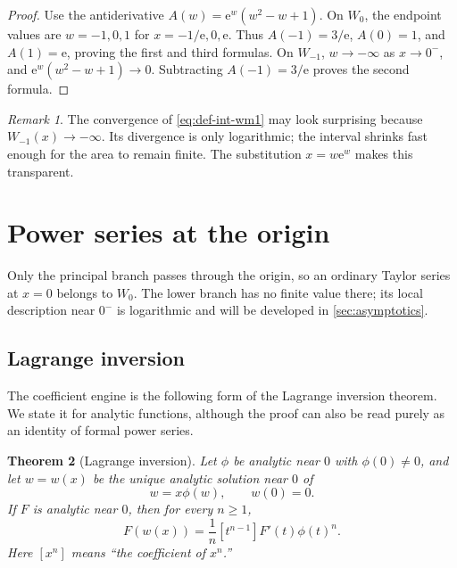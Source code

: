 \documentclass[11pt]{article}
\numberwithin{equation}{section}
\newtheorem{theorem}{Theorem}[section]
\theoremstyle{definition}
\theoremstyle{remark}
\newtheorem{remark}[theorem]{Remark}
\newcommand{\e}{\mathrm e}
\begin{document}
\begin{proof}
Use the antiderivative $A(w)=\e^w(w^2-w+1)$.  On $W_0$, the endpoint values
are $w=-1,0,1$ for $x=-1/\e,0,\e$.  Thus
$A(-1)=3/\e$, $A(0)=1$, and $A(1)=\e$, proving the first and third formulas.
On $W_{-1}$, $w\to-\infty$ as $x\to0^-$, and
$\e^w(w^2-w+1)\to0$.  Subtracting $A(-1)=3/\e$ proves the second formula.
\end{proof}

\begin{remark}
The convergence of \eqref{eq:def-int-wm1} may look surprising because
$W_{-1}(x)\to-\infty$.  Its divergence is only logarithmic; the interval
shrinks fast enough for the area to remain finite.  The substitution
$x=w\e^w$ makes this transparent.
\end{remark}

\section{Power series at the origin}
\label{sec:taylor}

Only the principal branch passes through the origin, so an ordinary Taylor
series at $x=0$ belongs to $W_0$.  The lower branch has no finite value there;
its local description near $0^-$ is logarithmic and will be developed in
\cref{sec:asymptotics}.

\subsection{Lagrange inversion}

The coefficient engine is the following form of the Lagrange inversion
theorem.  We state it for analytic functions, although the proof can also be
read purely as an identity of formal power series.

\begin{theorem}[Lagrange inversion]
\label{thm:lagrange}
Let $\phi$ be analytic near $0$ with $\phi(0)\ne0$, and let $w=w(x)$ be the
unique analytic solution near $0$ of
\begin{equation}
  w=x\phi(w),\qquad w(0)=0.                            \label{eq:lagrange-implicit}
\end{equation}
If $F$ is analytic near $0$, then for every $n\ge1$,
\begin{equation}
  [x^n]F(w(x))=\frac1n[t^{n-1}]F'(t)\phi(t)^n.         \label{eq:lagrange-coeff}
\end{equation}
Here $[x^n]$ means ``the coefficient of $x^n$.''
\end{theorem}
\end{document}
